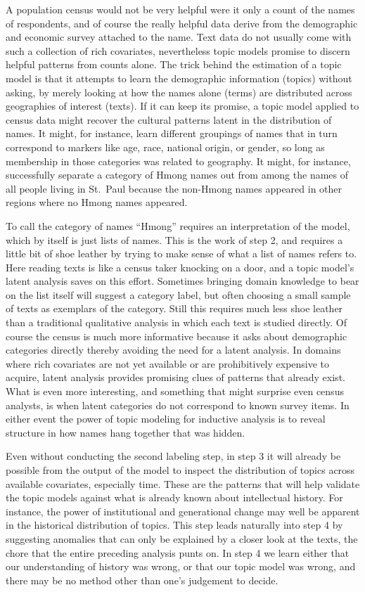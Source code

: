 \documentclass[]{book}
\theoremstyle{definition}
\theoremstyle{definition}
\theoremstyle{definition}
\theoremstyle{remark}
\begin{document}
A population census would not be very helpful were it only a count of
the names of respondents, and of course the really helpful data derive
from the demographic and economic survey attached to the name. Text data
do not usually come with such a collection of rich covariates,
nevertheless topic models promise to discern helpful patterns from
counts alone. The trick behind the estimation of a topic model is that
it attempts to learn the demographic information (topics) without
asking, by merely looking at how the names alone (terms) are distributed
across geographies of interest (texts). If it can keep its promise, a
topic model applied to census data might recover the cultural patterns
latent in the distribution of names. It might, for instance, learn
different groupings of names that in turn correspond to markers like
age, race, national origin, or gender, so long as membership in those
categories was related to geography. It might, for instance,
successfully separate a category of Hmong names out from among the names
of all people living in St.~Paul because the non-Hmong names appeared in
other regions where no Hmong names appeared.

To call the category of names ``Hmong'' requires an interpretation of
the model, which by itself is just lists of names. This is the work of
step 2, and requires a little bit of shoe leather by trying to make
sense of what a list of names refers to. Here reading texts is like a
census taker knocking on a door, and a topic model's latent analysis
saves on this effort. Sometimes bringing domain knowledge to bear on the
list itself will suggest a category label, but often choosing a small
sample of texts as exemplars of the category. Still this requires much
less shoe leather than a traditional qualitative analysis in which each
text is studied directly. Of course the census is much more informative
because it asks about demographic categories directly thereby avoiding
the need for a latent analysis. In domains where rich covariates are not
yet available or are prohibitively expensive to acquire, latent analysis
provides promising clues of patterns that already exist. What is even
more interesting, and something that might surprise even census
analysts, is when latent categories do not correspond to known survey
items. In either event the power of topic modeling for inductive
analysis is to reveal structure in how names hang together that was
hidden.

Even without conducting the second labeling step, in step 3 it will
already be possible from the output of the model to inspect the
distribution of topics across available covariates, especially time.
These are the patterns that will help validate the topic models against
what is already known about intellectual history. For instance, the
power of institutional and generational change may well be apparent in
the historical distribution of topics. This step leads naturally into
step 4 by suggesting anomalies that can only be explained by a closer
look at the texts, the chore that the entire preceding analysis punts
on. In step 4 we learn either that our understanding of history was
wrong, or that our topic model was wrong, and there may be no method
other than one's judgement to decide.
\end{document}
